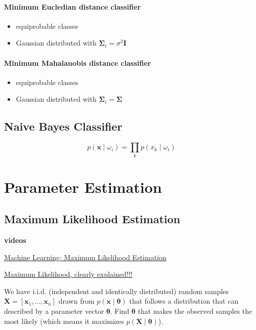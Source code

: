 \documentclass{article}
\begin{document}
\begin{multicols}{2}
\paragraph{Minimum Eucledian distance classifier}
\begin{itemize}
	\item equiprobable classes
	\item Gaussian distributed with $\symbf{\Sigma}_i = \sigma^2 \symbf{I}$
\end{itemize}

\paragraph{Minimum Mahalanobis distance classifier}
\begin{itemize}
	\item equiprobable classes
	\item Gaussian distributed with $\symbf{\Sigma}_i = \symbf{\Sigma}$
\end{itemize}

\subsection{Naive Bayes Classifier}
\[p(\symbf{x} \mid \omega_i) = \prod_{k} p(x_k \mid \omega_i)\]


\section{Parameter Estimation}

\subsection{Maximum Likelihood Estimation}
\begin{mdframed}
	\textbf{videos}

	\href{https://www.youtube.com/watch?v=sguol03tfWo&list=PL5yR0euE9N2kGEf7gqysMFq0Spoq0evNf&index=2}{Machine Learning: Maximum Likelihood Estimation}

	\href{https://www.youtube.com/watch?v=XepXtl9YKwc}{Maximum Likelihood, clearly explained!!!}
\end{mdframed}

We have i.i.d. (independent and identically distributed) random samples $\symbf{X} = [\symbf{x}_1, \ldots, \symbf{x}_n]$ drawn from $p(\symbf{x} \mid \symbf{\theta})$ that follows a distribution that can described by a parameter vector $\symbf{\theta}$.
Find $\symbf{\theta}$ that makes the observed samples the most likely (which means it maximizes $p(\symbf{X} \mid \symbf{\theta})$).


\end{multicols}
\end{document}
